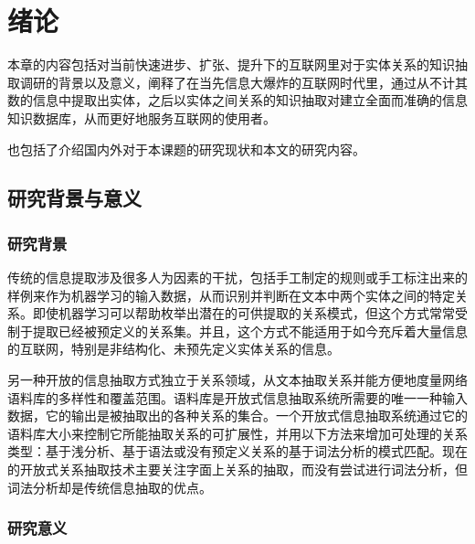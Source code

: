 \chapter{绪论}
\label{chap:introduction}

本章的内容包括对当前快速进步、扩张、提升下的互联网里对于实体关系的知识抽取调研的背景以及意义，阐释了在当先信息大爆炸的互联网时代里，通过从不计其数的信息中提取出实体，之后以实体之间关系的知识抽取对建立全面而准确的信息知识数据库，从而更好地服务互联网的使用者。

也包括了介绍国内外对于本课题的研究现状和本文的研究内容。

\section{研究背景与意义}
\subsection{研究背景}

传统的信息提取涉及很多人为因素的干扰，包括手工制定的规则或手工标注出来的样例来作为机器学习的输入数据，从而识别并判断在文本中两个实体之间的特定关系\citep{wang}。即使机器学习可以帮助枚举出潜在的可供提取的关系模式，但这个方式常常受制于提取已经被预定义的关系集。并且，这个方式不能适用于如今充斥着大量信息的互联网，特别是非结构化、未预先定义实体关系的信息。

另一种开放的信息抽取\citep{banko}方式独立于关系领域，从文本抽取关系并能方便地度量网络语料库的多样性和覆盖范围。语料库是开放式信息抽取系统所需要的唯一一种输入数据，它的输出是被抽取出的各种关系的集合。一个开放式信息抽取系统通过它的语料库大小来控制它所能抽取关系的可扩展性，并用以下方法来增加可处理的关系类型：基于浅分析、基于语法或没有预定义关系的基于词法分析的模式匹配\citep{wu2010, naka2012, etz2011}。现在的开放式关系抽取技术主要关注字面上关系的抽取，而没有尝试进行词法分析，但词法分析却是传统信息抽取的优点。

\subsection{研究意义}

